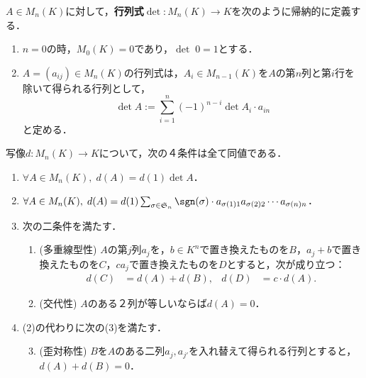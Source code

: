 \documentclass[uplatex, dvipdfmx]{jsreport}
\begin{document}
\begin{definition}[determinant]
    $A\in M_n(K)$に対して，\textbf{行列式}$\det:M_n(K)\to K$を次のように帰納的に定義する．
    \begin{enumerate}
        \item $n=0$の時，$M_0(K)=0$であり，$\det\; 0=1$とする．
        \item $A=(a_{ij})\in M_n(K)$の行列式は，$A_i\in M_{n-1}(K)$を$A$の第$n$列と第$i$行を除いて得られる行列として，
        \[ \det A:=\sum^n_{i=1}(-1)^{n-i}\det A_i\cdot a_{in} \]
        と定める．
    \end{enumerate}
\end{definition}

\begin{proposition}\label{prop-characterization-of-determinant}
    写像$d:M_n(K)\to K$について，次の４条件は全て同値である．
    \begin{enumerate}
        \item $\forall A\in M_n(K),\;d(A)=d(1)\det A$．
        \item $\forall A\in M_n(K),\;d(A)=d(1)\sum_{\sigma\in\mathfrak{S}_n}\sgn(\sigma)\cdot a_{\sigma(1)1}a_{\sigma(2)2}\cdots a_{\sigma(n)n}$．
        \item 次の二条件を満たす．
        \begin{enumerate}[(1)]
            \item (多重線型性)  $A$の第$j$列$a_j$を，$b\in K^n$で置き換えたものを$B$，$a_j+b$で置き換えたものを$C$，$ca_j$で置き換えたものを$D$とすると，次が成り立つ：
            \begin{align*}
                d(C)&=d(A)+d(B),&d(D)&=c\cdot d(A).
            \end{align*}
            \item (交代性)  $A$のある２列が等しいならば$d(A)=0$．
        \end{enumerate}
        \item (2)の代わりに次の(3)を満たす．
        \begin{enumerate}[(1)]\setcounter{enumii}{2}
            \item (歪対称性)  $B$を$A$のある二列$a_j,a_{j'}$を入れ替えて得られる行列とすると，$d(A)+d(B)=0$．
        \end{enumerate}
    \end{enumerate}
\end{proposition}
\end{document}
